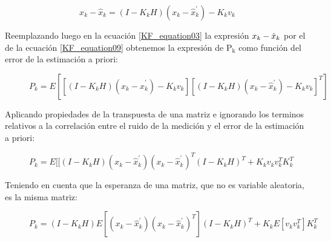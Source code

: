 \documentclass[10pt,a4paper]{article}
\begin{document}
	\begin{figure}[h!]
		\begin{center}
			\begin{equation}
				x_k - \hat{x}_k = (I-K_k H)(x_k - \hat{x}^\prime_k) - K_kv_{k}
				\label{KF_equation09}
			\end{equation}	
		\end{center}
	\end{figure}
	
	
	\noindent Reemplazando luego en la ecuación \ref{KF_equation03} la expresión 
    $\noindent{x_k - \hat{x}_k}$ por el de la ecuación \ref{KF_equation09} 
    obtenemos la expresión de $\mathrm{P_k}$ como función del error de la 
    estimación a priori:
	
	\begin{figure}[h!]
		\begin{center}
			\begin{equation}
				P_k = E[[(I-K_k H)(x_k - \hat{x}^\prime_k) - K_kv_{k}][ (I-K_k H)(x_k - \hat{x}^\prime_k) - K_kv_{k}]^T]
				\label{KF_equation10}
			\end{equation}	
		\end{center}
	\end{figure}
	
	\noindent Aplicando propiedades de la transpuesta de una matriz e ignorando 
    los terminos relativos a la correlación entre el ruido de la medición y el 
    error de la estimación a priori:
	
	\begin{figure}[h!]
		\begin{center}
			\begin{equation}
				P_k = E[[(I-K_k H)(x_k - \hat{x}^\prime_k)(x_k - \hat{x}^\prime_k)^T(I-K_k H)^T + K_k v_{k} v_{k}^T K_k^T 
				\label{KF_equation11}
			\end{equation}	
		\end{center}
	\end{figure}
	
	\noindent Teniendo en cuenta que la esperanza de una matriz, que no es 
    variable aleatoria, es la misma matriz:
	
	\begin{figure}[h!]
		\begin{center}
			\begin{equation}
				P_k = (I-K_k H) E[(x_k - \hat{x}^\prime_k)(x_k - \hat{x}^\prime_k)^T](I-K_k H)^T + K_k E[v_{k} v_{k}^T] K_k^T 
				\label{KF_equation12}
			\end{equation}	
		\end{center}
	\end{figure}
	
\end{document}
